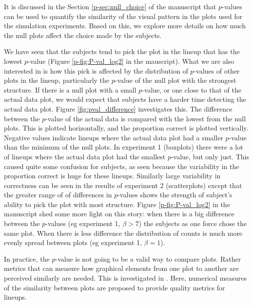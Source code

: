 \documentclass[12pt]{article}
\begin{document}
It is discussed in the Section \ref{p-sec:null_choice} of the manuscript that $p$-values can be used to quantify the similarity of the visual pattern in the plots used for the simulation experiments. Based on this, we explore more details on how much the null plots affect the choice made by the subjects. 

We have seen that the subjects tend to pick the plot in the lineup that has the lowest $p$-value (Figure \ref{p-fig:P-val_log2} in the mauscript). What we are also interested in  is how this pick is affected by the distribution  of $p$-values of other plots in the lineup, particularly the $p$-value of the null plot with the strongest structure. If there is a null plot with a small $p$-value, or one close to that of the actual data plot, we would expect that subjects have a harder time detecting the actual data plot. Figure \ref{fig:pval_difference} investigates this. The difference between the $p$-value of the actual data is compared with the lowest from the null plots. This is plotted horizontally, and the proportion correct is plotted vertically. Negative values indicate lineups where the actual data plot had a smaller $p$-value than the minimum of the null plots. In experiment 1 (boxplots) there were a lot of lineups where the actual data plot had the smallest $p$-value, but only just. This caused quite some confusion for subjects, as seen because the variability in the proportion correct is huge for these lineups. Similarly large variability in correctness can be seen in the results of experiment 2 (scatterplots) except that the greater range of of differences in $p$-values shows the strength of subject's ability to pick the plot with most structure. Figure \ref{p-fig:P-val_log2} in the manuscript shed some more light on this story: when there is a big difference between the $p$-values (eg experiment 1, $\beta>7$) the subjects as one force chose the same plot. When there is less difference the distribution of counts is much more evenly spread between plots (eg experiment 1, $\beta=1$). 

In practice, the $p$-value is not going to be a valid way to compare plots. Rather metrics that can measure how graphical elements from one plot to another are perceived similarly are needed. This is investigated in \citet{niladri:2012}. Here, numerical measures of the similarity between plots are proposed to provide quality metrics for lineups.
\end{document}

